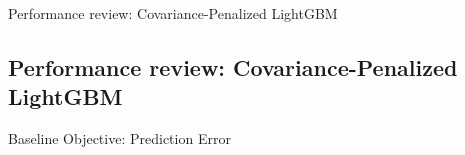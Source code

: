 \documentclass[aspectratio=169,10pt]{beamer}
\begin{document}
\newcommand{\frameF}{Performance review: Covariance-Penalized LightGBM}
\newcommand{\captionF}{{\scriptsize Test \underline{behavior}. Percentual change vs {LGBMRegressor} in parentheses ({\color{green!60!black} improvement} / {\color{red!70!black}worsening}). For MAE/COD/COV: lower is better. For VEI/PRB: closer to 0 (reduction in $|x|$). For PRD/MKI: closer to 1 (reduction in $|x -1|$).}}
\begin{frame}{\frameF}
\subsection{\frameF}

\begin{block}{{\color{red}Baseline Objective:} Prediction Error }
\begin{table}[]
    \centering
{}
\caption{{\scriptsize Test results for Accuracy (R2, MAE), horizontal equity (COD, COV), and vertical equity (VEI, PRD, PRB, MKI).}}
\vspace{-4mm}
\end{table}
\end{block}



\end{frame}
\end{document}
